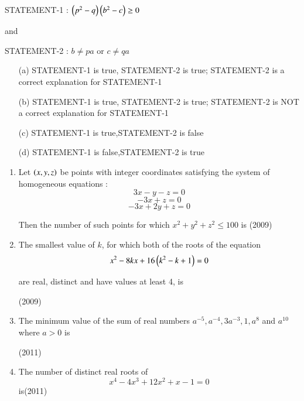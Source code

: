 \documentclass[journal,12pt,twocolumn]{IEEEtran}
\theoremstyle{remark}
\begin{document}
STATEMENT-1 : $\left(p^{2}-q\right)\left(b^{2}-c\right)\geq0$

and

STATEMENT-2 : $b\neq pa$ or $c\neq qa$
\begin{enumerate}
\item[(a)]
STATEMENT-1 is true, STATEMENT-2 is true; STATEMENT-2 is a correct explanation for STATEMENT-1
\item[(b)]
STATEMENT-1 is true, STATEMENT-2 is true; STATEMENT-2 is NOT a correct explanation for STATEMENT-1
\item[(c)]
STATEMENT-1 is true,STATEMENT-2 is false
\item[(d)]
STATEMENT-1 is false,STATEMENT-2 is true 

\end{enumerate}

\begin{enumerate}

\item 
Let $\left(x,y,z\right)$ be points with integer coordinates satisfying the system of homogeneous equations : $$3x-y-z=0$$$$-3x+z=0$$$$-3x+2y+z=0$$

Then the number of such points for which ${x^{2}+y^{2}+z^{2}\leq100}$ is \hfill(2009)

\item 
The smallest value of $k$, for which both of the roots of the equation $$x^{2}-8kx+16\left(k^{2}-k+1\right)=0$$

are real, distinct and have values at least 4, is 

                                \hfill(2009)

\item 
The minimum value of the sum of real numbers $a^{-5},a^{-4},3a^{-3},1,a^{8}$ and $a^{10}$ where $a>0$ is

\hfill(2011)

\item 
The number of distinct real roots of $$x^{4}-4x^{3}+12x^{2}+x-1=0$$ is\hfill(2011)
\end{enumerate}
\end{document}
